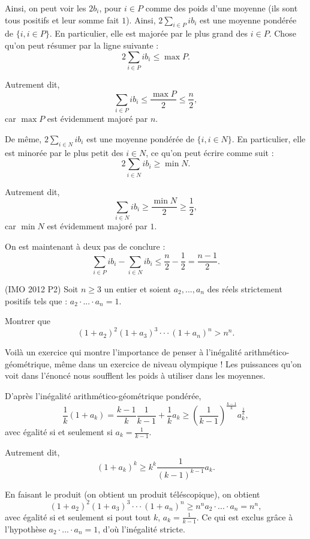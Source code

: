 \begin{sol}
Ainsi, on peut voir les $2b_i$, pour $i \in P$ comme des poids d'une moyenne (ils sont tous positifs et leur somme fait $1$). Ainsi, $2\sum_{i \in P} ib_i$ est une moyenne pondérée de $\{i,i \in P\}$. En particulier, elle est majorée par le plus grand des $i \in P$. Chose qu'on peut résumer par la ligne suivante :
\[
2\sum_{i \in P} ib_i \leq \max P.
\]

Autrement dit,
\[
\sum_{i \in P} ib_i \leq \frac{\max P}2 \leq \frac{n}2,
\]
car $\max P$ est évidemment majoré par $n$.

De même, $2 \sum_{i \in N} ib_i$ est une moyenne pondérée de $\{i,i \in N\}$. En particulier, elle est minorée par le plus petit des $i \in N$, ce qu'on peut écrire comme suit :
\[
2\sum_{i \in N} ib_i \geq \min N.
\]

Autrement dit,
\[
\sum_{i \in N} ib_i \geq \frac{\min N}2 \geq \frac12,
\]
car $\min N$ est évidemment majoré par $1$.

On est maintenant à deux pas de conclure :
\[
\sum_{i \in P} ib_i - \sum_{i \in N} ib_i \leq \frac{n}2 - \frac12 = \frac{n-1}2.
\]
\end{sol}

\begin{exo}
(IMO 2012 P2)
Soit $n \geq 3$ un entier et soient $a_2,...,a_n$ des réels strictement positifs tels que : $a_2 \cdot ... \cdot a_n =1$.

Montrer que 
\[
(1+a_2)^2(1+a_3)^3 \cdot \cdot \cdot (1+a_n)^n > n^n.
\]
\end{exo}

\begin{sol}
Voilà un exercice qui montre l'importance de penser à l'inégalité arithmético-géométrique, même dans un exercice de niveau olympique ! Les puissances qu'on voit dans l'énoncé nous soufflent les poids à utiliser dans les moyennes.

D'après l'inégalité arithmético-géométrique pondérée,
\[
\frac1{k}(1+a_k) = \frac{k-1}{k} \frac1{k-1} + \frac1{k} a_k \geq \left(\frac1{k-1}\right)^{\frac{k-1}{k}}a_k^{\frac1{k}},
\]
avec égalité si et seulement si $a_k = \frac1{k-1}$.

Autrement dit,
\[
(1+a_k)^k \geq k^k \frac1{(k-1)^{k-1}} a_k.
\]

En faisant le produit (on obtient un produit téléscopique), on obtient
\[
(1+a_2)^2(1+a_3)^3 \cdot \cdot \cdot (1+a_n)^n \geq n^n a_2 \cdot ... \cdot a_n = n^n,
\]
avec égalité si et seulement si pout tout $k$, $a_k = \frac1{k-1}$. Ce qui est exclus grâce à l'hypothèse $a_2 \cdot ... \cdot a_n =1$, d'où l'inégalité stricte.
\end{sol}


